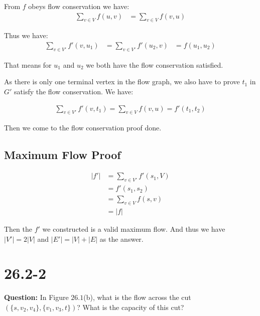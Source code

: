 \documentclass[12pt]{article}
\begin{document}
From $f$ obeys flow conservation we have:
\begin{equation}
\begin{aligned}
 \sum_{v \in V} f(u,v) &= \sum_{v \in V} f(v,u)
\end{aligned}
\end{equation}

Thus we have:
\begin{equation}
\begin{aligned}
\sum_{v \in V'} f'(v, u_1) &= \sum_{v \in V'} f'(u_2, v)
&= f(u_1, u_2)
\end{aligned}
\end{equation}

That means for $u_1$ and $u_2$ we both have the flow conservation satisfied.

As there is only one terminal vertex in the flow graph, we also have to prove $t_1$ in $G'$ satisfy the flow conservation. We have:

\begin{equation}
\begin{aligned}
\sum_{v \in V'} f'(v, t_1) = \sum_{v \in V} f(v, u) = f'(t_1, t_2)
\end{aligned}
\end{equation}

Then we come to the flow conservation proof done. 

\subsection{Maximum Flow  Proof}

\begin{equation}
\begin{aligned}
|f'| &= \sum_{v \in V'} f'(s_1, V) \\
&= f'(s_1, s_2) \\
&= \sum_{v \in V} f(s, v) \\
&= |f|
\end{aligned}
\end{equation}

Then the $f'$ we constructed is a valid maximum flow. And thus we have $|V'| = 2|V|$ and $|E'| = |V| + |E|$ as the answer.




\section{26.2-2}
\textbf{Question: }
In Figure $\text{26.1}$(b), what is the flow across the cut $(\{s, v_2, v_4\}, \{v_1, v_3, t\})$? What is the capacity of this cut?
\end{document}
